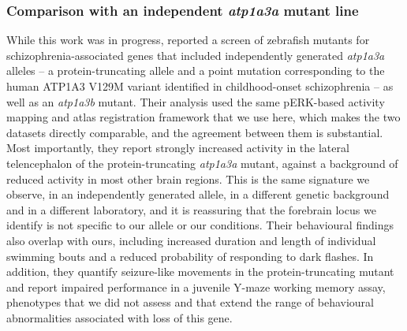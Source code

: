 \documentclass[9.5pt,lineno]{RandlettLab_elife}
\begin{document}
\subsubsection{Comparison with an independent \emph{atp1a3a} mutant line}

While this work was in progress, \citet{Moyer2026} reported a screen of zebrafish mutants for schizophrenia-associated genes that included independently generated \emph{atp1a3a} alleles -- a protein-truncating allele and a point mutation corresponding to the human ATP1A3 V129M variant identified in childhood-onset schizophrenia -- as well as an \emph{atp1a3b} mutant.
Their analysis used the same pERK-based activity mapping and atlas registration framework that we use here, which makes the two datasets directly comparable, and the agreement between them is substantial.
Most importantly, they report strongly increased activity in the lateral telencephalon of the protein-truncating \emph{atp1a3a} mutant, against a background of reduced activity in most other brain regions.
This is the same signature we observe, in an independently generated allele, in a different genetic background and in a different laboratory, and it is reassuring that the forebrain locus we identify is not specific to our allele or our conditions.
Their behavioural findings also overlap with ours, including increased duration and length of individual swimming bouts and a reduced probability of responding to dark flashes.
In addition, they quantify seizure-like movements in the protein-truncating mutant and report impaired performance in a juvenile Y-maze working memory assay, phenotypes that we did not assess and that extend the range of behavioural abnormalities associated with loss of this gene.
\end{document}
